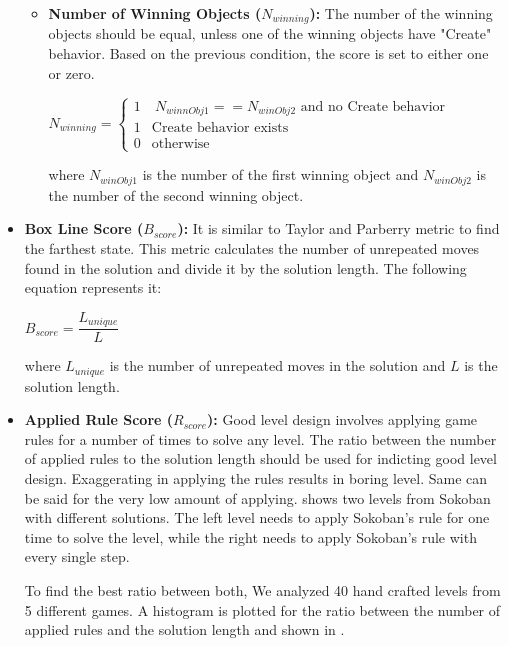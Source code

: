 \begin{itemize}
\begin{itemize}
		\item \textbf{Number of Winning Objects ($N_{winning}$):} The number of the winning objects should be equal, unless one of the winning objects have "Create" behavior. Based on the previous condition, the score is set to either one or zero.
		\begin{center}
			$N_{winning}= \begin{cases}
			               1 & \ N_{winnObj1} == N_{winObj2} \text{ and no Create behavior}\\
			               1 & \text{Create behavior exists}\\
			               0 & \text{otherwise}
			           \end{cases}$
		\end{center}
		where $N_{winObj1}$ is the number of the first winning object and $N_{winObj2}$ is the number of the second winning object.
	\end{itemize}
	
	\item \textbf{Box Line Score ($B_{score}$):} It is similar to Taylor and Parberry\cite{sokobanLevelGenerationNew} metric to find the farthest state. This metric calculates the number of unrepeated moves found in the solution and divide it by the solution length. The following equation represents it:
	\begin{center}$B_{score} = \dfrac{L_{unique}}{L}$\end{center}
	where $L_{unique}$ is the number of unrepeated moves in the solution and $L$ is the solution length.
	
	\item \textbf{Applied Rule Score ($R_{score}$):} Good level design involves applying game rules for a number of times to solve any level. The ratio between the number of applied rules to the solution length should be used for indicting good level design. Exaggerating in applying the rules results in boring level. Same can be said for the very low amount of applying.  shows two levels from Sokoban with different solutions. The left level needs to apply Sokoban's rule for one time to solve the level, while the right needs to apply Sokoban's rule with every single step.
	
	
	To find the best ratio between both, We analyzed 40 hand crafted levels from 5 different games. A histogram is plotted for the ratio between the number of applied rules and the solution length and shown in .
	

\end{itemize}
